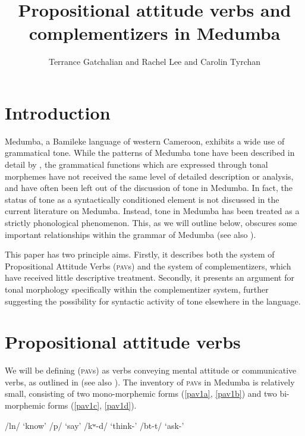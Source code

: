 \documentclass[output=paper,colorlinks,citecolor=brown]{langscibook}
\author{Terrance Gatchalian\affiliation{University of British Columbia} and Rachel Lee\affiliation{University of British Columbia} and  Carolin Tyrchan\affiliation{University of Potsdam}}
\title{Propositional attitude verbs and complementizers in Medumba}
\begin{document}
\maketitle

\section{Introduction}

Medumba, a Bamileke language of western Cameroon, exhibits a wide use of grammatical tone. While the patterns of Medumba tone have been described in detail by \citet{Voorhoeve1971}, the grammatical functions which are expressed through tonal morphemes have not received the same level of detailed description or analysis, and have often been left out of the discussion of tone in Medumba. In fact, the status of tone as a syntactically conditioned element is not discussed in the current literature on Medumba. Instead, tone in Medumba has been treated as a strictly phonological phenomenon. This, as we will outline below, obscures some important relationships within the grammar of Medumba (see also \citealt{Keupdjio2020}).

This paper has two principle aims. Firstly, it describes both the system of Propositional Attitude Verbs (\textsc{pav}s) and the system of complementizers, which have received little descriptive treatment. Secondly, it presents an argument for tonal morphology specifically within the complementizer system, further suggesting the possibility for syntactic activity of tone elsewhere in the language.

\section{Propositional attitude verbs}

We will be defining  (\textsc{pav}s) as verbs conveying mental attitude or communicative verbs, as outlined in \citet{Pearson2021} (see also \citealt{Asher1987}). The inventory of \textsc{pav}s in Medumba is relatively small, consisting of two mono-morphemic forms (\ref{pav1a}, \ref{pav1b}) and two bi-morphemic forms (\ref{pav1c}, \ref{pav1d}).

\ea \label{PAV1}
    \begin{xlist}
    \ex /l\epL n/                   \tab `know'                  \label{pav1a}
    \ex /p/                   \tab `say'                   \label{pav1b}
    \ex /kʷ\epL-d\schwaL/           \tab `think-'      \label{pav1c}
    \ex /b\epH t-t\schwaH/          \tab `ask-'        \label{pav1d}
    \end{xlist}
\z
\end{document}
